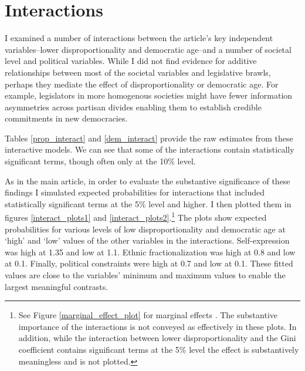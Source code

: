 \documentclass[a4paper]{article}\usepackage[]{graphicx}\usepackage[]{color}
\begin{document}
\section*{Interactions}


I examined a number of interactions between the article's key independent variables--lower disproportionality and democratic age--and a number of societal level and political variables. While I did not find evidence for additive relationships between most of the societal variables and legislative brawls, perhaps they mediate the effect of disproportionality or democratic age. For example, legislators in more homogenous societies might have fewer information asymmetries across partisan divides enabling them to establish credible commitments in new democracies.

Tables \ref{prop_interact} and \ref{dem_interact} provide the raw estimates from these interactive models. We can see that some of the interactions contain statistically significant terms, though often only at the 10\% level.

As in the main article, in order to evaluate the substantive significance of these findings I simulated expected probabilities for interactions that included statistically significant terms at the 5\% level and higher. I then plotted them in figures \ref{interact_plots1} and \ref{interact_plots2}.\footnote{See Figure \ref{marginal_effect_plot} for marginal effects \citep{Brambor2006}. The substantive importance of the interactions is not conveyed as effectively in these plots. In addition, while the interaction between lower disproportionality and the Gini coefficient contains significant terms at the 5\% level the effect is substantively meaningless and is not plotted.} The plots show expected probabilities for various levels of low disproportionality and democratic age at `high' and `low' values of the other variables in the interactions. Self-expression was high at 1.35 and low at 1.1. Ethnic fractionalization was high at 0.8 and low at 0.1. Finally, political constraints were high at 0.7 and low at 0.1. These fitted values are close to the variables' minimum and maximum values to enable the largest meaningful contrasts.
\end{document}

